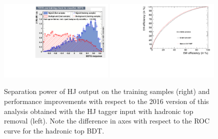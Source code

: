 \begin{figure}[htp]
\centering
\includegraphics[width=0.49\textwidth]{ch8_figs/Jtagger_Ks.pdf}
\includegraphics[width=0.49\textwidth]{ch8_figs/Roc_Comparison_18Feb.pdf}
\caption[Performance improvement from the HJ tagger and hadronic top removal]{Separation power of HJ output on the training samples (right) and performance improvements with respect to the 2016 version of this analysis obtained with the HJ
tagger input with hadronic top removal (left). Note the difference in axes with respect to the ROC curve for the hadronic top BDT.}
\label{fig:hj_tagger}
\end{figure}

